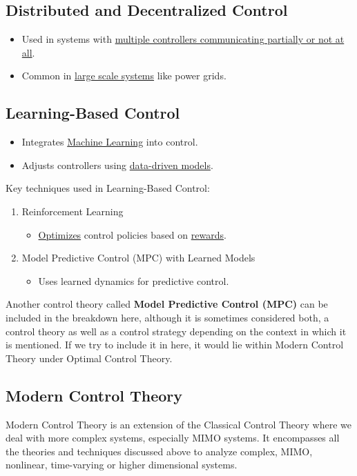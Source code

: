 \documentclass{article}
\begin{document}
\subsection{Distributed and Decentralized Control}
\begin{itemize}
    \item Used in systems with \underline{multiple controllers communicating partially or not at all}.
    \item Common in \underline{large scale systems} like power grids.
\end{itemize}

\subsection{Learning-Based Control}
\begin{itemize}
    \item Integrates \underline{Machine Learning} into control.
    \item Adjusts controllers using \underline{data-driven models}.
\end{itemize}
Key techniques used in Learning-Based Control:
\begin{enumerate}
    \item Reinforcement Learning
        \begin{itemize}
            \item \underline{Optimizes} control policies based on \underline{rewards}.
        \end{itemize}
    \item Model Predictive Control (MPC) with Learned Models
        \begin{itemize}
            \item Uses learned dynamics for predictive control.
        \end{itemize}
\end{enumerate}

Another control theory called \textbf{Model Predictive Control (MPC)} can be included in the breakdown here, although it is sometimes considered both, a control theory as well as a control strategy depending on the context in which it is mentioned. If we try to include it in here, it would lie within Modern Control Theory under Optimal Control Theory.

\subsection{Modern Control Theory}
Modern Control Theory is an extension of the Classical Control Theory where we deal with more complex systems, especially MIMO systems. It encompasses all the theories and techniques discussed above to analyze complex, MIMO, nonlinear, time-varying or higher dimensional systems.
\end{document}
